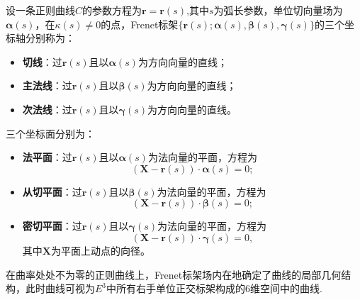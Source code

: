 \documentclass[../../main.tex]{subfiles}%
\begin{document}
\begin{definition}\label{definition:Frenet标架定义}
设一条正则曲线$C$的参数方程为$\bm{r}=\bm{r}(s)$,其中$s$为弧长参数，单位切向量场为$\bm{\alpha}(s)$，在$\kappa(s)\neq0$的点，Frenet标架$\{\bm{r}(s);\bm{\alpha}(s),\bm{\beta}(s),\bm{\gamma}(s)\}$的三个坐标轴分别称为：
\begin{itemize}
\item \textbf{切线}：过$\bm{r}(s)$且以$\bm{\alpha}(s)$为方向向量的直线；
\item \textbf{主法线}：过$\bm{r}(s)$且以$\bm{\beta}(s)$为方向向量的直线；
\item \textbf{次法线}：过$\bm{r}(s)$且以$\bm{\gamma}(s)$为方向向量的直线。
\end{itemize}
三个坐标面分别为：
\begin{itemize}
\item \textbf{法平面}：过$\bm{r}(s)$且以$\bm{\alpha}(s)$为法向量的平面，方程为
\[
(\bm{X}-\bm{r}(s))\cdot\bm{\alpha}(s)=0;
\]
\item \textbf{从切平面}：过$\bm{r}(s)$且以$\bm{\beta}(s)$为法向量的平面，方程为
\[
(\bm{X}-\bm{r}(s))\cdot\bm{\beta}(s)=0;
\]
\item \textbf{密切平面}：过$\bm{r}(s)$且以$\bm{\gamma}(s)$为法向量的平面，方程为
\[
(\bm{X}-\bm{r}(s))\cdot\bm{\gamma}(s)=0,
\]
其中$\bm{X}$为平面上动点的向径。
\end{itemize}
\end{definition}
\begin{remark}
在曲率处处不为零的正则曲线上，Frenet标架场内在地确定了曲线的局部几何结构，此时曲线可视为$E^3$中所有右手单位正交标架构成的6维空间中的曲线.
\end{remark}
\end{document}
